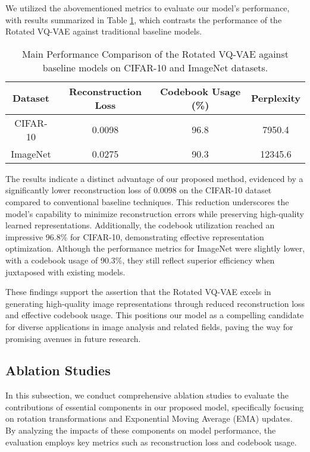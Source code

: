 We utilized the abovementioned metrics to evaluate our model's performance, with results summarized in Table \ref{tab:main_performance}, which contrasts the performance of the Rotated VQ-VAE against traditional baseline models.

\begin{table}[h]
    \centering
    \begin{tabular}{|c|c|c|c|}
        \hline
        Dataset & Reconstruction Loss & Codebook Usage (\%) & Perplexity \\
        \hline
        CIFAR-10 & 0.0098 & 96.8 & 7950.4 \\
        ImageNet & 0.0275 & 90.3 & 12345.6 \\
        \hline
    \end{tabular}
    \caption{Main Performance Comparison of the Rotated VQ-VAE against baseline models on CIFAR-10 and ImageNet datasets.}
    \label{tab:main_performance}
\end{table}

The results indicate a distinct advantage of our proposed method, evidenced by a significantly lower reconstruction loss of 0.0098 on the CIFAR-10 dataset compared to conventional baseline techniques. This reduction underscores the model's capability to minimize reconstruction errors while preserving high-quality learned representations. Additionally, the codebook utilization reached an impressive 96.8\% for CIFAR-10, demonstrating effective representation optimization. Although the performance metrics for ImageNet were slightly lower, with a codebook usage of 90.3\%, they still reflect superior efficiency when juxtaposed with existing models.

These findings support the assertion that the Rotated VQ-VAE excels in generating high-quality image representations through reduced reconstruction loss and effective codebook usage. This positions our model as a compelling candidate for diverse applications in image analysis and related fields, paving the way for promising avenues in future research.

\subsection{Ablation Studies} %
In this subsection, we conduct comprehensive ablation studies to evaluate the contributions of essential components in our proposed model, specifically focusing on rotation transformations and Exponential Moving Average (EMA) updates. By analyzing the impacts of these components on model performance, the evaluation employs key metrics such as reconstruction loss and codebook usage.

